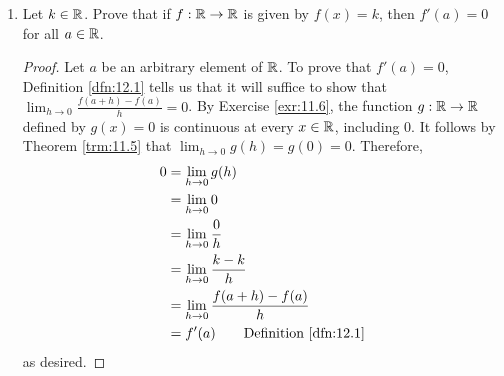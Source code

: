 \documentclass[../main.tex]{subfiles}
\begin{document}
\begin{exercise}
\begin{enumerate}[label={(\alph*)}]
\begin{proof}
\begin{align*}
                &= \lim_{x\to a}\frac{x^n-a^n}{x-a}\tag*{Exercise \ref{exr:12.7}}\\
                &= \lim_{x\to a}\frac{f(x)-f(a)}{x-a}\\
                &= f'(a)\tag*{Theorem \ref{trm:12.4}}
            \end{align*}
            as desired.
        \end{proof}
        \item Let $k\in\mathbb{R}$. Prove that if $f:\mathbb{R}\to\mathbb{R}$ is given by $f(x)=k$, then $f'(a)=0$ for all $a\in\mathbb{R}$.
        \begin{proof}
            Let $a$ be an arbitrary element of $\mathbb{R}$. To prove that $f'(a)=0$, Definition \ref{dfn:12.1} tells us that it will suffice to show that $\lim_{h\to 0}\frac{f(a+h)-f(a)}{h}=0$. By Exercise \ref{exr:11.6}, the function $g:\mathbb{R}\to\mathbb{R}$ defined by $g(x)=0$ is continuous at every $x\in\mathbb{R}$, including 0. It follows by Theorem \ref{trm:11.5} that $\lim_{h\to 0}g(h)=g(0)=0$. Therefore,
            \begin{align*}
                0 &= \lim_{h\to 0}g(h)\\
                &= \lim_{h\to 0}0\\
                &= \lim_{h\to 0}\frac{0}{h}\\
                &= \lim_{h\to 0}\frac{k-k}{h}\\
                &= \lim_{h\to 0}\frac{f(a+h)-f(a)}{h}\\
                &= f'(a)\tag*{Definition \ref{dfn:12.1}}
            \end{align*}
            as desired.
        \end{proof}
    \end{enumerate}
\end{exercise}
\end{document}
